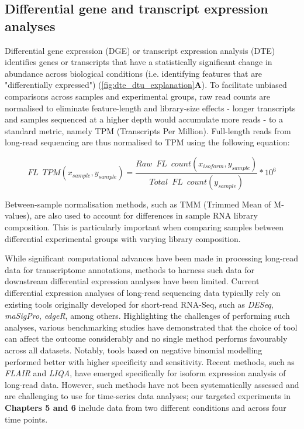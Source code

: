 \subsection{Differential gene and transcript expression analyses}
Differential gene expression (DGE) or transcript expression analysis (DTE) identifies genes or transcripts that have a statistically significant change in abundance across biological conditions (i.e. identifying features that are "differentially expressed") (\cref{fig:dte_dtu_explanation}\textbf{A}). To facilitate unbiased comparisons across samples and experimental groups, raw read counts are normalised to eliminate feature-length and library-size effects - longer transcripts and samples sequenced at a higher depth would accumulate more reads - to a standard metric, namely TPM (Transcripts Per Million). Full-length reads from long-read sequencing are thus normalised to TPM using the following equation: 

\begin{myequation}[!h]
	\begin{equation}
		FL\;\:TPM (x_{sample},y_{sample})=\frac{Raw\;\:FL\;\:count (x_{isoform},y_{sample})}{Total\;\:FL\;\:count (y_{sample})} *10^6
	\end{equation}
\end{myequation}

Between-sample normalisation methods, such as TMM\cite{Robinson2010} (Trimmed Mean of M-values), are also used to account for differences in sample RNA library composition. This is particularly important when comparing samples between differential experimental groups with varying library composition. 

While significant computational advances have been made in processing long-read data for transcriptome annotations, methods to harness such data for downstream differential expression analyses have been limited. Current differential expression analyses of long-read sequencing data typically rely on existing tools originally developed for short-read RNA-Seq\cite{Amarasinghe2020}, such as \textit{DESeq}, \textit{maSigPro}, \textit{edgeR}, among others. Highlighting the challenges of performing such analyses, various benchmarking studies have demonstrated that the choice of tool can affect the outcome considerably and no single method performs favourably across all datasets. Notably, tools based on negative binomial modelling performed better with higher specificity and sensitivity\cite{Rapaport2013}. Recent methods, such as \textit{FLAIR} and \textit{LIQA}\cite{Hu2021}, have emerged specifically for isoform expression analysis of long-read data. However, such methods have not been systematically assessed and are challenging to use for time-series data analyses; our targeted experiments in \textbf{Chapters 5 and 6} include data from two different conditions and across four time points. 

